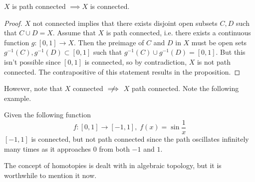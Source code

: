   \begin{proposition}
    $X$ is path connected $\implies X$ is connected. 
    \begin{figure}[H]
      \centering 
      \caption{}  
      \label{fig:path_vs_reg_connectedness}
    \end{figure}
  \end{proposition}
  \begin{proof}
    $X$ not connected implies that there exists disjoint open subsets $C, D$ such that $C \cup D = X$. Assume that $X$ is path connected, i.e. there exists a continuous function $g: [0,1] \longrightarrow X$. Then the preimage of $C$ and $D$ in $X$ must be open sets $g^{-1} (C), g^{-1} (D) \subset [0,1]$ such that $g^{-1}(C) \cup g^{-1}(D) = [0,1]$. But this isn't possible since $[0,1]$ is connected, so by contradiction, $X$ is not path connected. The contrapositive of this statement results in the proposition. 
  \end{proof}

  However, note that $X$ connected $\centernot\implies$ $X$ path connected. Note the following example. 

  \begin{example}
    Given the following function 
    \begin{equation}
      f:[0,1] \longrightarrow [-1,1], \; f(x) = \sin{\frac{1}{x}}
    \end{equation}
    $[-1,1]$ is connected, but not path connected since the path oscillates infinitely many times as it approaches $0$ from both $-1$ and $1$. 
  \end{example}

  The concept of homotopies is dealt with in algebraic topology, but it is worthwhile to mention it now. 

